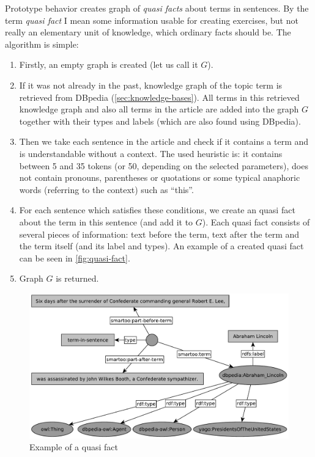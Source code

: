 \documentclass[12pt, twoside]{fithesis2}
\renewcommand{\_}{\leavevmode \kern0.07em\vbox{\hrule width0.4em}}
\newenvironment{myEnumerate}{
  \begin{enumerate}[leftmargin=2em,rightmargin=1em,itemsep=\parskip ,parsep=0em,topsep=0em,partopsep=0em]
}{
  \end{enumerate}
}
\begin{document}
Prototype behavior creates graph of \textit{quasi facts} about terms in sentences.
By the term \textit{quasi fact} I mean some information usable for creating exercises, but not really an elementary unit of knowledge, which ordinary facts should be. The algorithm is simple:
\begin{myEnumerate}
  \item Firstly, an empty graph is created (let us call it $G$).
  \item If it was not already in the past, knowledge graph of the topic term is retrieved from DBpedia (\autoref{sec:knowledge-bases}). All terms in this retrieved knowledge graph and also all terms in the article are added into the graph $G$ together with their types and labels (which are also found using DBpedia).
  \item Then we take each sentence in the article and check if it contains a term and is understandable without a context. The used heuristic is: it contains between 5 and 35 tokens (or 50, depending on the selected parameters), does not contain pronouns, parentheses or quotations or some typical anaphoric words (referring to the context) such as ``this''.
  \item For each sentence which satisfies these conditions, we create an quasi fact about the term in this sentence (and add it to $G$). Each quasi fact consists of several pieces of information: text before the term, text after the term and the term itself (and its label and types). An example of a created quasi fact can be seen in \autoref{fig:quasi-fact}.
  \item Graph $G$ is returned.
\end{myEnumerate}


\begin{figure}[h]
  \centering
  \includegraphics[width=\textwidth]{images/quasi-fact-lincoln.pdf}
  \caption{Example of a quasi fact}
  \label{fig:quasi-fact}
\end{figure}
\end{document}
